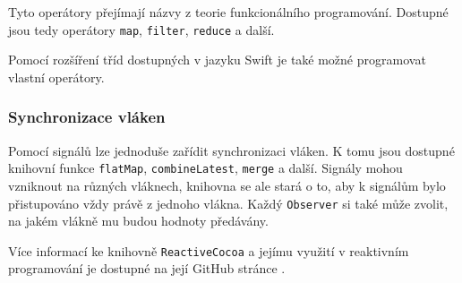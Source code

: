 Tyto operátory přejímají názvy z teorie funkcionálního programování.
Dostupné jsou tedy operátory \texttt{map}, \texttt{filter}, \texttt{reduce} a další.

Pomocí rozšíření tříd dostupných v jazyku Swift je také možné programovat vlastní operátory.

\subsubsection*{Synchronizace vláken}

Pomocí signálů lze jednoduše zařídit synchronizaci vláken.
K tomu jsou dostupné knihovní funkce \texttt{flatMap}, \texttt{combineLatest}, \texttt{merge} a další.
Signály mohou vzniknout na různých vláknech, knihovna se ale stará o to, aby k signálům bylo přistupováno vždy právě z jednoho vlákna.
Každý \texttt{Observer} si také může zvolit, na jakém vlákně mu budou hodnoty předávány.

Více informací ke knihovně \texttt{ReactiveCocoa} a jejímu využití v reaktivním programování je dostupné na její GitHub stránce \cite{github-reactivecocoa}.

